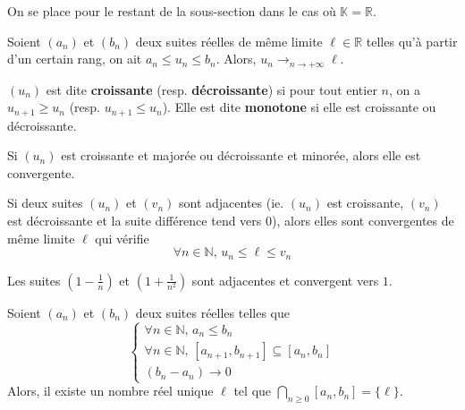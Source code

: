   On se place pour le restant de la sous-section dans le cas où $\mathbb{K} = \mathbb{R}$.

  \begin{theorem}
    Soient $(a_n)$ et $(b_n)$ deux suites réelles de même limite $\ell \in \mathbb{R}$ telles qu'à partir d'un certain rang, on ait $a_n \leq u_n \leq b_n$. Alors, $u_n \longrightarrow_{n \rightarrow +\infty} \ell$.
  \end{theorem}

  \begin{definition}
    $(u_n)$ est dite \textbf{croissante} (resp. \textbf{décroissante}) si pour tout entier $n$, on a $u_{n+1} \geq u_n$ (resp. $u_{n+1} \leq u_n$). Elle est dite \textbf{monotone} si elle est croissante ou décroissante.
  \end{definition}

  \begin{theorem}
    Si $(u_n)$ est croissante et majorée ou décroissante et minorée, alors elle est convergente.
  \end{theorem}

  \begin{theorem}
    Si deux suites $(u_n)$ et $(v_n)$ sont adjacentes (ie. $(u_n)$ est croissante, $(v_n)$ est décroissante et la suite différence tend vers $0$), alors elles sont convergentes de même limite $\ell$ qui vérifie
    \[ \forall n \in \mathbb{N}, \, u_n \leq \ell \leq v_n \]
  \end{theorem}

  \begin{example}
    Les suites $\left( 1 - \frac{1}{n} \right)$ et $\left( 1 + \frac{1}{n^2} \right)$ sont adjacentes et convergent vers $1$.
  \end{example}


  \begin{corollary}
    Soient $(a_n)$ et $(b_n)$ deux suites réelles telles que
    \[
      \begin{cases}
        \forall n \in \mathbb{N}, \, a_n \leq b_n \\
        \forall n \in \mathbb{N}, \, [a_{n+1}, b_{n+1}] \subseteq [a_n, b_n] \\
        (b_n - a_n) \longrightarrow 0
      \end{cases}
    \]
    Alors, il existe un nombre réel unique $\ell$ tel que $\bigcap_{n \geq 0} [a_n, b_n] = \{ \ell \}$.
  \end{corollary}

